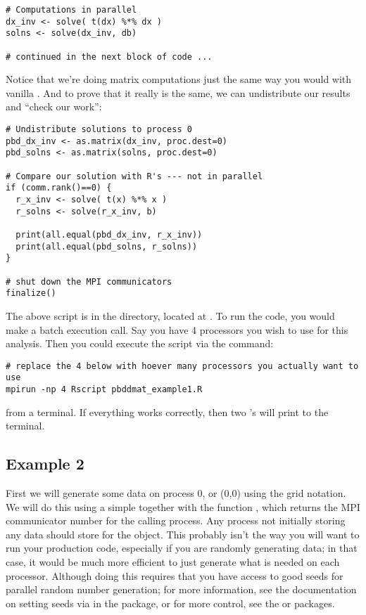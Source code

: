 \begin{lstlisting}[language=rr,title=Simple Matrix Operations]
# Computations in parallel
dx_inv <- solve( t(dx) %*% dx )
solns <- solve(dx_inv, db)

# continued in the next block of code ...
\end{lstlisting}

Notice that we're doing matrix computations just the same way you would with vanilla .  And to prove that it really is the same, we can undistribute our results and ``check our work'':

\begin{lstlisting}[language=rr,title=Comparing Results to \proglang{R}]
# Undistribute solutions to process 0
pbd_dx_inv <- as.matrix(dx_inv, proc.dest=0)
pbd_solns <- as.matrix(solns, proc.dest=0)

# Compare our solution with R's --- not in parallel
if (comm.rank()==0) {
  r_x_inv <- solve( t(x) %*% x )
  r_solns <- solve(r_x_inv, b)
  
  print(all.equal(pbd_dx_inv, r_x_inv))
  print(all.equal(pbd_solns, r_solns))
}

# shut down the MPI communicators
finalize()
\end{lstlisting}

The above script is in the  directory, located at .  To run the code, you would make a batch execution call.  Say you have 4 processors you wish to use for this analysis.  Then you could execute the script via the command:

\begin{lstlisting}
# replace the 4 below with hoever many processors you actually want to use
mpirun -np 4 Rscript pbddmat_example1.R
\end{lstlisting}

from a terminal.  If everything works correctly, then two 's will print to the terminal.












\subsection{Example 2}

First we will generate some data on process 0, or (0,0) using the grid notation.  We will do this using a simple  together with the  function , which returns the MPI communicator number for the calling process.  Any process not initially storing any data should store  for the object.  This probably isn't the way you will want to run your production code, especially if you are randomly generating data; in that case, it would be much more efficient to just generate what is needed on each processor.  Although doing this requires that you have access to good seeds for parallel random number generation; for more information, see the documentation on setting seeds via  in the  package, or for more control, see the  or  packages.  

